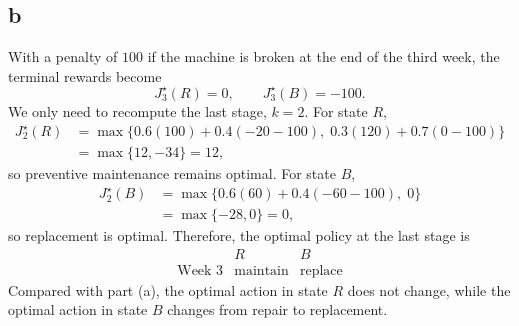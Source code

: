 \documentclass{article}
\begin{document}
\subsection*{b}
With a penalty of $100$ if the machine is broken at the end of the third
week, the terminal rewards become
\[J_3^\star(R)=0, \qquad J_3^\star(B)=-100.\]
We only need to recompute the last stage, $k=2$. For state $R$,
\[\begin{aligned}
J_2^\star(R)
&=\max\{0.6(100)+0.4(-20-100),\;
0.3(120)+0.7(0-100)\}\\
&=\max\{12,-34\}=12,
\end{aligned}\]
so preventive maintenance remains optimal.
For state $B$,
\[\begin{aligned}
J_2^\star(B)
&=\max\{0.6(60)+0.4(-60-100),\;0\}\\
&=\max\{-28,0\}=0,
\end{aligned} \]
so replacement is optimal.
Therefore, the optimal policy at the last stage is
\[\begin{array}{c|cc}
& R & B\\ \hline
\text{Week 3} & \text{maintain} & \text{replace}
\end{array} \]
Compared with part (a), the optimal action in state $R$ does not change,
while the optimal action in state $B$ changes from repair to replacement.
\end{document}
